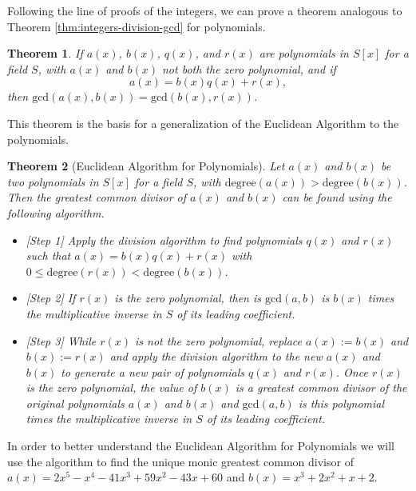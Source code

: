 \documentclass[
]{book}
\providecommand{\tightlist}{%
  \setlength{\itemsep}{0pt}\setlength{\parskip}{0pt}}
\newtheorem{theorem}{Theorem}[chapter]
\theoremstyle{definition}
\theoremstyle{definition}
\theoremstyle{definition}
\theoremstyle{definition}
\theoremstyle{remark}
\begin{document}
Following the line of proofs of the integers, we can prove a theorem analogous to Theorem \ref{thm:integers-division-gcd} for polynomials.

\begin{theorem}
\protect\hypertarget{thm:polynomial-division-gcd}{}\label{thm:polynomial-division-gcd}If \(a(x)\), \(b(x)\), \(q(x)\), and \(r(x)\) are polynomials in \(S[x]\) for a field \(S\), with \(a(x)\) and \(b(x)\) not both the zero polynomial, and if \[a(x)=b(x)q(x)+r(x),\] then \(\mathrm{gcd}(a(x),b(x))=\mathrm{gcd}(b(x),r(x))\).
\end{theorem}

This theorem is the basis for a generalization of the Euclidean Algorithm to the polynomials.

\begin{theorem}[Euclidean Algorithm for Polynomials]

Let \(a(x)\) and \(b(x)\) be two polynomials in \(S[x]\) for a field \(S\), with \(\mathrm{degree}(a(x))>\mathrm{degree}(b(x))\). Then the greatest common divisor of \(a(x)\) and \(b(x)\) can be found using the following algorithm.

\begin{itemize}
\tightlist
\item
  {[}Step 1{]} Apply the division algorithm to find polynomials \(q(x)\) and \(r(x)\) such that \(a(x)=b(x)q(x)+r(x)\) with \(0\leq \mathrm{degree}(r(x))<\mathrm{degree}(b(x))\).
\item
  {[}Step 2{]} If \(r(x)\) is the zero polynomial, then is \(\mathrm{gcd}(a,b)\) is \(b(x)\) times the multiplicative inverse in \(S\) of its leading coefficient.
\item
  {[}Step 3{]} While \(r(x)\) is not the zero polynomial, replace \(a(x):=b(x)\) and \(b(x):=r(x)\) and apply the division algorithm to the new \(a(x)\) and \(b(x)\) to generate a new pair of polynomials \(q(x)\) and \(r(x)\). Once \(r(x)\) is the zero polynomial, the value of \(b(x)\) is a greatest common divisor of the original polynomials \(a(x)\) and \(b(x)\) and \(\mathrm{gcd}(a,b)\) is this polynomial times the multiplicative inverse in \(S\) of its leading coefficient.
\end{itemize}

\end{theorem}

In order to better understand the Euclidean Algorithm for Polynomials we will use the algorithm to find the unique monic greatest common divisor of \(a(x)=2x^5-x^4-41x^3+59x^2-43x+60\) and \(b(x)=x^3+2x^2+x+2\).
\end{document}

